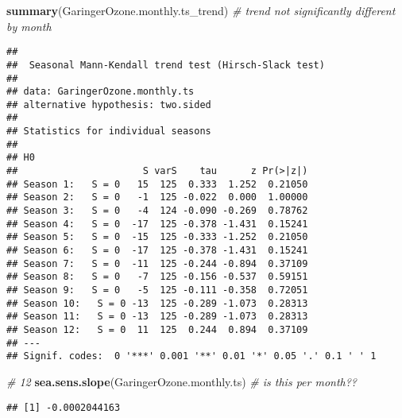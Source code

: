 \documentclass[
]{article}
\newenvironment{Shaded}{\begin{snugshade}}{\end{snugshade}}
\newcommand{\CommentTok}[1]{\textcolor[rgb]{0.56,0.35,0.01}{\textit{#1}}}
\newcommand{\DataTypeTok}[1]{\textcolor[rgb]{0.13,0.29,0.53}{#1}}
\newcommand{\FloatTok}[1]{\textcolor[rgb]{0.00,0.00,0.81}{#1}}
\newcommand{\KeywordTok}[1]{\textcolor[rgb]{0.13,0.29,0.53}{\textbf{#1}}}
\newcommand{\NormalTok}[1]{#1}
\newcommand{\OperatorTok}[1]{\textcolor[rgb]{0.81,0.36,0.00}{\textbf{#1}}}
\newcommand{\StringTok}[1]{\textcolor[rgb]{0.31,0.60,0.02}{#1}}
\begin{document}
\begin{Shaded}
\begin{Highlighting}[]
\KeywordTok{summary}\NormalTok{(GaringerOzone.monthly.ts_trend) }\CommentTok{# trend not significantly different by month}
\end{Highlighting}
\end{Shaded}

\begin{verbatim}
## 
##  Seasonal Mann-Kendall trend test (Hirsch-Slack test)
## 
## data: GaringerOzone.monthly.ts
## alternative hypothesis: two.sided
## 
## Statistics for individual seasons
## 
## H0
##                      S varS    tau      z Pr(>|z|)  
## Season 1:   S = 0   15  125  0.333  1.252  0.21050  
## Season 2:   S = 0   -1  125 -0.022  0.000  1.00000  
## Season 3:   S = 0   -4  124 -0.090 -0.269  0.78762  
## Season 4:   S = 0  -17  125 -0.378 -1.431  0.15241  
## Season 5:   S = 0  -15  125 -0.333 -1.252  0.21050  
## Season 6:   S = 0  -17  125 -0.378 -1.431  0.15241  
## Season 7:   S = 0  -11  125 -0.244 -0.894  0.37109  
## Season 8:   S = 0   -7  125 -0.156 -0.537  0.59151  
## Season 9:   S = 0   -5  125 -0.111 -0.358  0.72051  
## Season 10:   S = 0 -13  125 -0.289 -1.073  0.28313  
## Season 11:   S = 0 -13  125 -0.289 -1.073  0.28313  
## Season 12:   S = 0  11  125  0.244  0.894  0.37109  
## ---
## Signif. codes:  0 '***' 0.001 '**' 0.01 '*' 0.05 '.' 0.1 ' ' 1
\end{verbatim}

\begin{Shaded}
\begin{Highlighting}[]
\CommentTok{# 12}
\KeywordTok{sea.sens.slope}\NormalTok{(GaringerOzone.monthly.ts) }\CommentTok{# is this per month??}
\end{Highlighting}
\end{Shaded}

\begin{verbatim}
## [1] -0.0002044163
\end{verbatim}

\begin{Shaded}
\end{Shaded}
\end{document}
